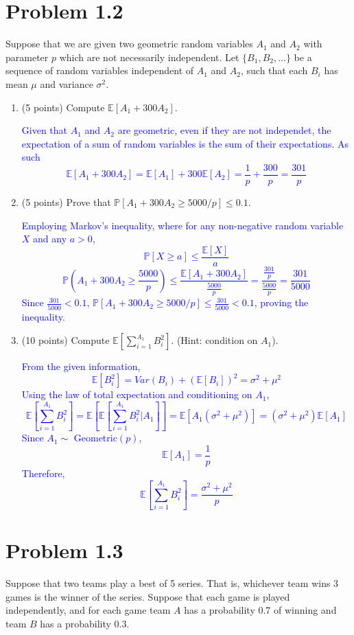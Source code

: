 \documentclass{article}
\begin{document}
\section*{Problem 1.2}
Suppose that we are given two geometric random variables $A_1$ and $A_2$ with parameter $p$ which are not necessarily independent. Let $\{B_1, B_2, \dots\}$ be a sequence of random variables independent of $A_1$ and $A_2$, such that each $B_i$ has mean $\mu$ and variance $\sigma^2$.

\begin{enumerate}[label=(\alph*)]
    \item (5 points) Compute $\mathbb{E}[A_1 + 300A_2]$.

    \textcolor{blue}{Given that $A_1$ and $A_2$ are geometric, even if they are not independet, the expectation of a sum of random variables is the sum of their expectations. As such
    $$\mathbb{E}[A_1 + 300A_2]=\mathbb{E}[A_1] + 300\mathbb{E}[A_2]=\frac{1}{p}+\frac{300}{p}=\frac{301}{p}$$}

    \item (5 points) Prove that $\mathbb{P}[A_1 + 300A_2 \geq 5000/p] \leq 0.1$.

        \textcolor{blue}{Employing Markov's inequality, where for any non-negative random variable $X$ and any $a>0$, $$\mathbb{P}[X \geq a] \leq \frac{\mathbb{E}[X]}{a}$$
        $$\mathbb{P}\left( A_1 + 300A_2 \geq \frac{5000}{p} \right) \leq \frac{\mathbb{E}[A_1 + 300A_2]}{\frac{5000}{p}}=\frac{\frac{301}{p}}{\frac{5000}{p}}=\frac{301}{5000}$$
    Since $\frac{301}{5000} < 0.1$, $\mathbb{P}[A_1 + 300A_2 \geq 5000/p] \leq \frac{301}{5000} < 0.1$, proving the inequality.}


    \item (10 points) Compute $\mathbb{E}[\sum_{i=1}^{A_1} B_i^2]$. (Hint: condition on $A_1$).

        \textcolor{blue}{From the given information, $$\mathbb{E}[B^2_i]=Var(B_i)+(\mathbb{E}[B_i])^2 = \sigma^2 + \mu^2$$
        Using the law of total expectation and conditioning on $A_1$, $$\mathbb{E}[\sum_{i=1}^{A_1} B_i^2]=\mathbb{E}[\mathbb{E}[\sum_{i=1}^{A_1} B_i^2|A_1]]=\mathbb{E}[A_1(\sigma^2 + \mu^2)]=(\sigma^2 + \mu^2)\mathbb{E}[A_1]$$
        Since $A_1 \sim $ Geometric$(p)$, $$\mathbb{E}[A_1]=\frac{1}{p}$$  
        Therefore, $$\mathbb{E}\left[ \sum_{i=1}^{A_1}B^2_i \right] = \frac{\sigma^2 + \mu^2}{p}$$}

\end{enumerate}

\section*{Problem 1.3}
Suppose that two teams play a best of 5 series. That is, whichever team wins 3 games is the winner of the series. Suppose that each game is played independently, and for each game team $A$ has a probability 0.7 of winning and team $B$ has a probability 0.3.
\end{document}
